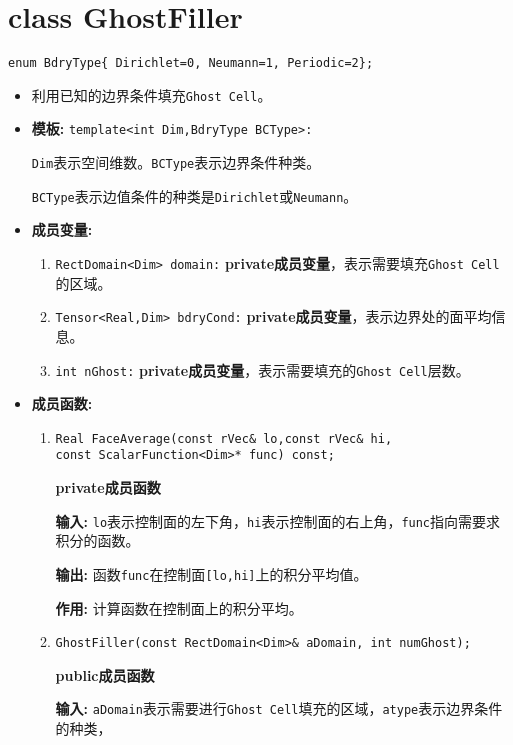 \documentclass[UTF8]{ctexart}
\theoremstyle{plain}
\theoremstyle{definition}
\theoremstyle{remark}
\begin{document}
\section{class GhostFiller}
\texttt{enum BdryType\{ Dirichlet=0, Neumann=1, Periodic=2\};}
\begin{itemize}
    \item 利用已知的边界条件填充\texttt{Ghost Cell}。
    \item \textbf{模板:} \texttt{template<int Dim,BdryType BCType>:}
    
    \texttt{Dim}表示空间维数。\texttt{BCType}表示边界条件种类。

    \texttt{BCType}表示边值条件的种类是\texttt{Dirichlet}或\texttt{Neumann}。
    \item \textbf{成员变量:}
    \begin{enumerate}
        \item \texttt{RectDomain<Dim> domain:} \textbf{private成员变量}，表示需要填充\texttt{Ghost Cell}的区域。
        \item \texttt{Tensor<Real,Dim> bdryCond:} \textbf{private成员变量}，表示边界处的面平均信息。
        \item \texttt{int nGhost:} \textbf{private成员变量}，表示需要填充的\texttt{Ghost Cell}层数。
    \end{enumerate}
    \item \textbf{成员函数:}
    \begin{enumerate}
        \item \texttt{Real FaceAverage(const rVec\& lo,const rVec\& hi,\\const ScalarFunction<Dim>* func) const;}
        
        \textbf{private成员函数}

        \textbf{输入:} \texttt{lo}表示控制面的左下角，\texttt{hi}表示控制面的右上角，\texttt{func}指向需要求积分的函数。

        \textbf{输出:} 函数\texttt{func}在控制面\texttt{[lo,hi]}上的积分平均值。

        \textbf{作用:} 计算函数在控制面上的积分平均。

        \item \texttt{GhostFiller(const RectDomain<Dim>\& aDomain, int numGhost);}
        
        \textbf{public成员函数}

        \textbf{输入:} \texttt{aDomain}表示需要进行\texttt{Ghost Cell}填充的区域，\texttt{atype}表示边界条件的种类， 
        

\end{enumerate}
\end{itemize}
\end{document}
